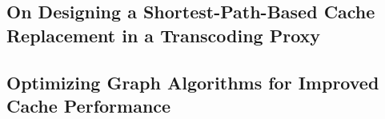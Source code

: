 \subsection{On Designing a Shortest-Path-Based Cache Replacement in a Transcoding Proxy}


\cite{spcrtp}


\subsection{Optimizing Graph Algorithms for Improved Cache Performance}

\cite{ogaicp}

